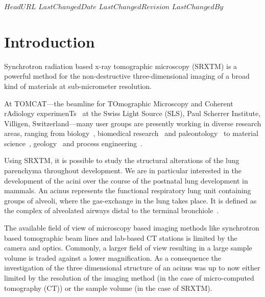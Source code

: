 \svnidlong
{$HeadURL$}
{$LastChangedDate$}
{$LastChangedRevision$}
{$LastChangedBy$}
%
%
\section{Introduction}

Synchrotron radiation based x-ray tomographic microscopy (SRXTM) is a powerful method for the non-destructive three-dimensional imaging of a broad kind of materials at sub-micrometer resolution.

At TOMCAT---the beamline for TOmographic Microscopy and Coherent rAdiology experimenTs~\cite{Stampanoni2007} at the Swiss Light Source (SLS), Paul Scherrer Institute, Villigen, Switzerland---many user groups are presently working in diverse research areas, ranging from biology~\cite{McDonald2009,PerezHuerta2009}, biomedical research~\cite{Schittny2008,Tsuda2008,Heinzer2008} and paleontology~\cite{Gostling2008,Friis2007,Hagadorn2006,Donoghue2006} to material science~\cite{Gallucci2007}, geology~\cite{Carminati2007} and process engineering~\cite{Davenport2007,Vaucher2007}.

Using SRXTM, it is possible to study the structural alterations of the lung parenchyma throughout development. We are in particular interested in the development of the acini over the course of the postnatal lung development in mammals. An acinus represents the functional respiratory lung unit containing groups of alveoli, where the gas-exchange in the lung takes place. It is defined as the complex of alveolated airways distal to the terminal bronchiole~\cite{Rodriguez1987}.

The available field of view of microscopy based imaging methods like synchrotron based tomographic beam lines and lab-based \micro CT stations is limited by the camera and optics. Commonly, a larger field of view resulting in a large sample volume is traded against a lower magnification. As a consequence the investigation of the three dimensional structure of an acinus was up to now either limited by the resolution of the imaging method (in the case of micro-computed tomography (\micro CT)) or the sample volume (in the case of SRXTM).

